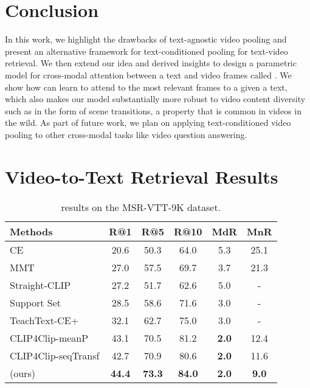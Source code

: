 \documentclass[10pt,twocolumn,letterpaper]{article}
\begin{document}
\section{Conclusion}
In this work, we highlight the drawbacks of text-agnostic video pooling and present an alternative framework for text-conditioned pooling for text-video retrieval.  We then extend our idea and derived insights to design a parametric model for cross-modal attention between a text and video frames called \ModelName{}. We show how \ModelName{} can learn to attend to the most relevant frames to a given a text, which also makes our model substantially more robust to video content diversity such as in the form of scene transitions, a property that is common in videos in the wild. As part of future work, we plan on applying text-conditioned video pooling to other cross-modal tasks like video question answering. 

{\small


}

\newpage
\appendix
\appendixpage
{}
\renewcommand\thefigure{\thesection\arabic{figure}}
\renewcommand\thetable{\thesection\arabic{table}}
\section{Video-to-Text Retrieval Results}

\begin{table}[h]
\setlength{\tabcolsep}{2pt}
\centering
\footnotesize
\begin{tabular}{l c c c c c} 
\hline 
Methods & R@1  & R@5  & R@10  & MdR  & MnR  \\
\hline
CE \cite{liu2019use} & 20.6 & 50.3 & 64.0 & 5.3 & 25.1 \\
MMT \cite{gabeur2020multi} & 27.0 & 57.5 & 69.7 & 3.7 & 21.3 \\
Straight-CLIP \cite{portillo2021straightforward} & 27.2 & 51.7 & 62.6 & 5.0 & - \\
Support Set \cite{patrick2020support} & 28.5 & 58.6 & 71.6 & 3.0 & - \\
TeachText-CE+ \cite{croitoru2021teachtext} & 32.1 & 62.7 & 75.0 & 3.0 & - \\ 
CLIP4Clip-meanP \cite{luo2021clip4clip} & 43.1 & 70.5 & 81.2 & \textbf{2.0} & 12.4 \\
CLIP4Clip-seqTransf \cite{luo2021clip4clip} & 42.7 & 70.9 & 80.6 & \textbf{2.0} & 11.6 \\
\ModelName{} (ours) & \textbf{44.4} & \textbf{73.3} & \textbf{84.0} & \textbf{2.0} & \textbf{9.0} \\
\hline
\end{tabular}
\vspace{-0.2cm}
\caption{ results on the MSR-VTT-9K dataset.}
\label{tab:msrvtt-9k-res-v2t}
\end{table}
\end{document}
